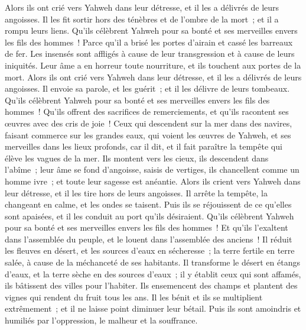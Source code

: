 \begin{multicols}{2}
Alors ils ont crié vers Yahweh dans leur détresse, et il les a délivrés de leurs angoisses.
Il les fit sortir hors des ténèbres et de l'ombre de la mort~; et il a rompu leurs liens.
Qu'ils célèbrent Yahweh pour sa bonté et ses merveilles envers les fils des hommes~!
Parce qu'il a brisé les portes d'airain et cassé les barreaux de fer.
Les insensés sont affligés à cause de leur transgression et à cause de leurs iniquités.
Leur âme a en horreur toute nourriture, et ils touchent aux portes de la mort.
Alors ils ont crié vers Yahweh dans leur détresse, et il les a délivrés de leurs angoisses.
Il envoie sa parole, et les guérit~; et il les délivre de leurs tombeaux.
Qu'ils célèbrent Yahweh pour sa bonté et ses merveilles envers les fils des hommes~!
Qu'ils offrent des sacrifices de remerciements, et qu'ils racontent ses œuvres avec des cris de joie~!
Ceux qui descendent sur la mer dans des navires, faisant commerce sur les grandes eaux,
qui voient les œuvres de Yahweh, et ses merveilles dans les lieux profonds,
car il dit, et il fait paraître la tempête qui élève les vagues de la mer.
Ils montent vers les cieux, ils descendent dans l'abîme~; leur âme se fond d'angoisse,
saisis de vertiges, ils chancellent comme un homme ivre~; et toute leur sagesse est anéantie.
Alors ils crient vers Yahweh dans leur détresse, et il les tire hors de leurs angoisses.
Il arrête la tempête, la changeant en calme, et les ondes se taisent.
Puis ils se réjouissent de ce qu'elles sont apaisées, et il les conduit au port qu'ils désiraient.
Qu'ils célèbrent Yahweh pour sa bonté et ses merveilles envers les fils des hommes~!
Et qu'ils l'exaltent dans l'assemblée du peuple, et le louent dans l'assemblée des anciens~!
Il réduit les fleuves en désert, et les sources d'eaux en sécheresse~;
la terre fertile en terre salée, à cause de la méchanceté de ses habitants.
Il transforme le désert en étangs d'eaux, et la terre sèche en des sources d'eaux~;
il y établit ceux qui sont affamés, ils bâtissent des villes pour l'habiter.
Ils ensemencent des champs et plantent des vignes qui rendent du fruit tous les ans.
Il les bénit et ils se multiplient extrêmement~; et il ne laisse point diminuer leur bétail.
Puis ils sont amoindris et humiliés par l'oppression, le malheur et la souffrance.

\end{multicols}
